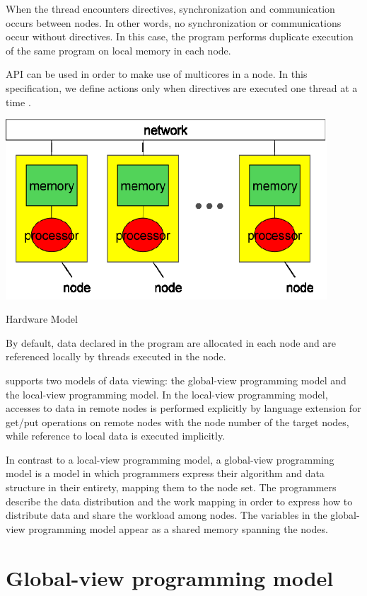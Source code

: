 When the thread encounters \XMP directives,
synchronization and communication occurs between nodes. In other words,
no synchronization or communications occur without directives. In
this case, the program performs duplicate execution of the same program
on local memory in each node.

\OMP API can be used in order to
make use of multicores in a node. In this specification, we define
actions only when \XMP directives are executed one thread at a time .

\begin{myfigure}
\includegraphics[width=12cm]{figs/Fig1.eps}
  \caption{Hardware Model}\label{fig1}
\end{myfigure}

By default, data declared in the program are allocated in each node and are referenced
locally by threads executed in the node. 

\XMP supports two models of data viewing: the global-view programming model and the local-view programming model. In the local-view programming model, accesses to data
in remote nodes is performed explicitly by language extension for get/put
operations on remote nodes with the node number of the target nodes, while
reference to local data is executed implicitly. 

In contrast to
a local-view programming model, a global-view programming model is
a model in which programmers express their algorithm and data structure in their entirety, mapping them to the node set. The programmers describe the
data distribution and the work mapping in order to express how to distribute
data and share the workload among nodes. The variables in the global-view
programming model appear as a shared memory spanning the nodes.

\section{Global-view programming model}

